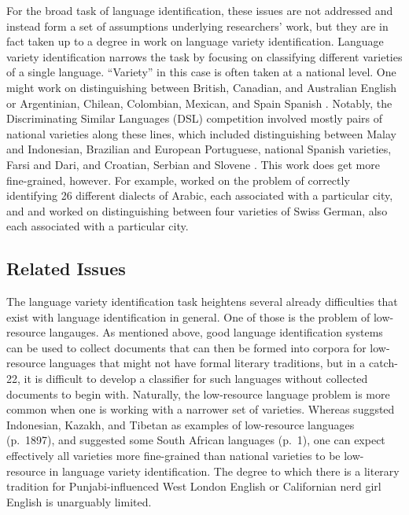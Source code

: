 \documentclass{article}
\begin{document}
    For the broad task of language identification, these issues are not addressed and instead form a set of assumptions underlying researchers' work, but they are in fact taken up to a degree in work on language variety identification.
    Language variety identification narrows the task by focusing on classifying different varieties of a single language.
    ``Variety'' in this case is often taken at a national level.
    One might work on distinguishing between British, Canadian, and Australian English \parencite{lui_classifying_2013} or Argentinian, Chilean, Colombian, Mexican, and Spain Spanish \parencite{maier_language_2014,rangel_low_2018}.
    Notably, the Discriminating Similar Languages (DSL) competition involved mostly pairs of national varieties along these lines, which included distinguishing between Malay and Indonesian, Brazilian and European Portuguese, national Spanish varieties, Farsi and Dari, and Croatian, Serbian and Slovene \parencite[p.~35]{malmasi_language_2015}.
    This work does get more fine-grained, however.
    For example, \textcite{ragab_mawdoo3_2019} worked on the problem of correctly identifying 26 different dialects of Arabic, each associated with a particular city, and \textcite{malmasi_german_2017} and \parencite{ciobanu_german_2018} worked on distinguishing between four varieties of Swiss German, also each associated with a particular city.

    \subsection{Related Issues}
      The language variety identification task heightens several already difficulties that exist with language identification in general.
      One of those is the problem of low-resource langauges.
      As mentioned above, good language identification systems can be used to collect documents that can then be formed into corpora for low-resource languages that might not have formal literary traditions, but in a catch-22, it is difficult to develop a classifier for such languages without collected documents to begin with.
      Naturally, the low-resource language problem is more common when one is working with a narrower set of varieties.
      Whereas \textcite{qi_study_2019} suggsted Indonesian, Kazakh, and Tibetan as examples of low-resource languages (p.~1897), and \textcite{duvenhage_short_2019} suggested some South African languages (p.~1), one can expect effectively all varieties more fine-grained than national varieties to be low-resource in language variety identification.
      The degree to which there is a literary tradition for Punjabi-influenced West London English \parencite{sharma_style_2011} or Californian nerd girl English \parencite{bucholtz_why_1999} is unarguably limited.
\end{document}
